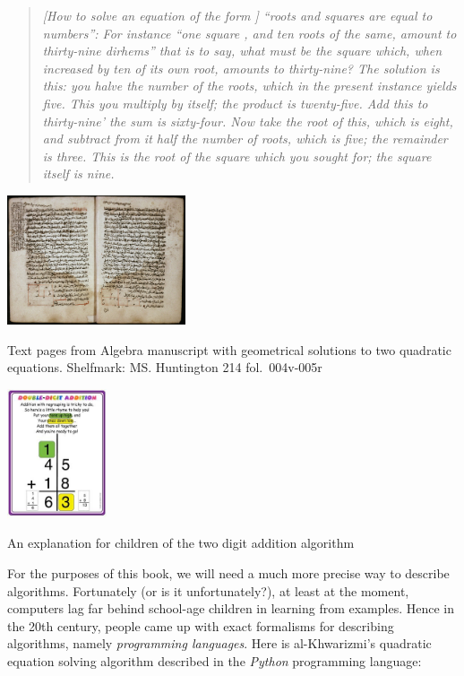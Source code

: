 \begin{quote}
\emph{{[}How to solve an equation of the form {]} ``roots and squares
are equal to numbers'': For instance ``one square , and ten roots of the
same, amount to thirty-nine dirhems'' that is to say, what must be the
square which, when increased by ten of its own root, amounts to
thirty-nine? The solution is this: you halve the number of the roots,
which in the present instance yields five. This you multiply by itself;
the product is twenty-five. Add this to thirty-nine' the sum is
sixty-four. Now take the root of this, which is eight, and subtract from
it half the number of roots, which is five; the remainder is three. This
is the root of the square which you sought for; the square itself is
nine.}
\end{quote}


\begin{marginfigure}
\centering
\includegraphics[width=\linewidth, height=1.5in, keepaspectratio]{../figure/alKhwarizmi.jpg}
\caption{Text pages from Algebra manuscript with geometrical solutions
to two quadratic equations. Shelfmark: MS. Huntington 214
fol.~004v-005r}
\label{alKhwarizmi}
\end{marginfigure}


\begin{marginfigure}
\centering
\includegraphics[width=\linewidth, height=1.5in, keepaspectratio]{../figure/addition_regrouping.jpg}
\caption{An explanation for children of the two digit addition
algorithm}
\label{childrenalg}
\end{marginfigure}

For the purposes of this book, we will need a much more precise way to
describe algorithms. Fortunately (or is it unfortunately?), at least at
the moment, computers lag far behind school-age children in learning
from examples. Hence in the 20th century, people came up with exact
formalisms for describing algorithms, namely \emph{programming
languages}. Here is al-Khwarizmi's quadratic equation solving algorithm
described in the \emph{Python} programming language:

